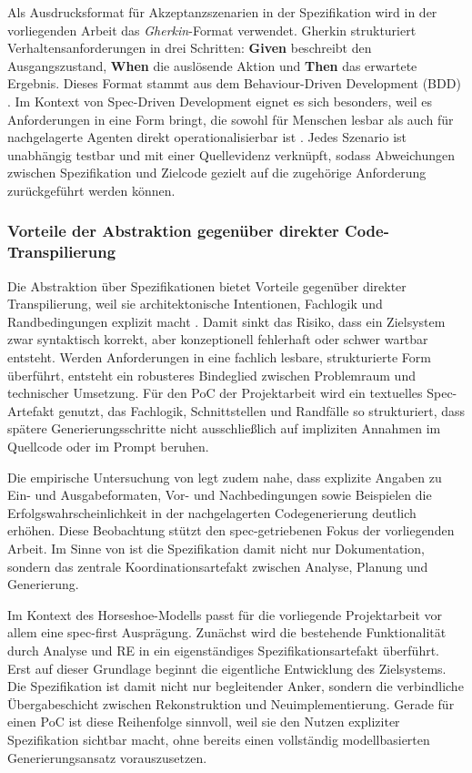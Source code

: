 Als Ausdrucksformat für Akzeptanzszenarien in der Spezifikation wird in der vorliegenden Arbeit das \emph{Gherkin}-Format verwendet. Gherkin strukturiert Verhaltensanforderungen in drei Schritten: \textbf{Given} beschreibt den Ausgangszustand, \textbf{When} die auslösende Aktion und \textbf{Then} das erwartete Ergebnis. Dieses Format stammt aus dem Behaviour-Driven Development (BDD) \parencite{north2006bdd}. Im Kontext von Spec-Driven Development eignet es sich besonders, weil es Anforderungen in eine Form bringt, die sowohl für Menschen lesbar als auch für nachgelagerte Agenten direkt operationalisierbar ist \parencite{githubspeckit}. Jedes Szenario ist unabhängig testbar und mit einer Quellevidenz verknüpft, sodass Abweichungen zwischen Spezifikation und Zielcode gezielt auf die zugehörige Anforderung zurückgeführt werden können.

\subsubsection{Vorteile der Abstraktion gegenüber direkter Code-Transpilierung}

Die Abstraktion über Spezifikationen bietet Vorteile gegenüber direkter Transpilierung, weil sie architektonische Intentionen, Fachlogik und Randbedingungen explizit macht \parencite{midolo2026promptguidelines,eniser2025realworld}. Damit sinkt das Risiko, dass ein Zielsystem zwar syntaktisch korrekt, aber konzeptionell fehlerhaft oder schwer wartbar entsteht. Werden Anforderungen in eine fachlich lesbare, strukturierte Form überführt, entsteht ein robusteres Bindeglied zwischen Problemraum und technischer Umsetzung. Für den PoC der Projektarbeit wird ein textuelles Spec-Artefakt genutzt, das Fachlogik, Schnittstellen und Randfälle so strukturiert, dass spätere Generierungsschritte nicht ausschließlich auf impliziten Annahmen im Quellcode oder im Prompt beruhen.

Die empirische Untersuchung von \textcite{midolo2026promptguidelines} legt zudem nahe, dass explizite Angaben zu Ein- und Ausgabeformaten, Vor- und Nachbedingungen sowie Beispielen die Erfolgswahrscheinlichkeit in der nachgelagerten Codegenerierung deutlich erhöhen. Diese Beobachtung stützt den spec-getriebenen Fokus der vorliegenden Arbeit. Im Sinne von \textcite{boeckeler2025sdd} ist die Spezifikation damit nicht nur Dokumentation, sondern das zentrale Koordinationsartefakt zwischen Analyse, Planung und Generierung.

Im Kontext des Horseshoe-Modells passt für die vorliegende Projektarbeit vor allem eine spec-first Ausprägung. Zunächst wird die bestehende Funktionalität durch Analyse und RE in ein eigenständiges Spezifikationsartefakt überführt. Erst auf dieser Grundlage beginnt die eigentliche Entwicklung des Zielsystems. Die Spezifikation ist damit nicht nur begleitender Anker, sondern die verbindliche Übergabeschicht zwischen Rekonstruktion und Neuimplementierung. Gerade für einen PoC ist diese Reihenfolge sinnvoll, weil sie den Nutzen expliziter Spezifikation sichtbar macht, ohne bereits einen vollständig modellbasierten Generierungsansatz vorauszusetzen.

